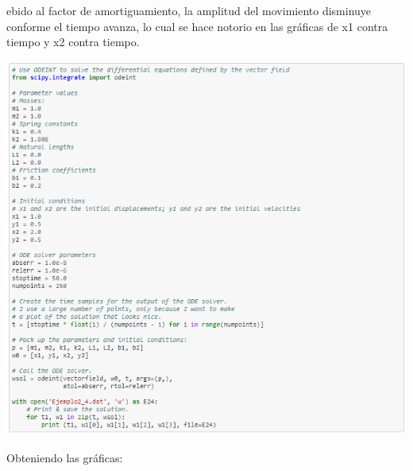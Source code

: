 \documentclass{article}
\begin{document}
ebido al factor de amortiguamiento, la amplitud del movimiento disminuye conforme el tiempo avanza, lo cual se hace notorio en las gráficas de x1 contra tiempo y x2 contra tiempo.
\begin{center}
    \includegraphics[width=.9\textwidth]{Datos4.PNG}
\end{center}
Obteniendo las gráficas:
\end{document}
